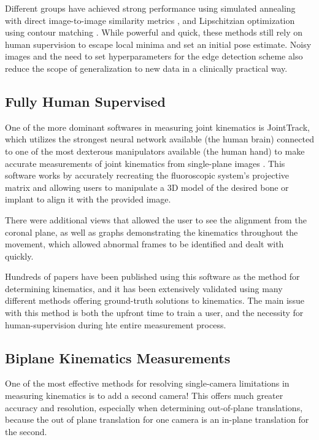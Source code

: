 Different groups have achieved strong performance using simulated annealing with direct image-to-image similarity metrics \cite{mahfouzRobustMethodRegistration2003}, and Lipschitzian optimization using contour matching \cite{floodAutomatedRegistration3D2018}. While powerful and quick, these methods still rely on human supervision to escape local minima and set an initial pose estimate. Noisy images and the need to set hyperparameters for the edge detection scheme also reduce the scope of generalization to new data in a clinically practical way.


\subsection{Fully Human Supervised}

One of the more dominant softwares in measuring joint kinematics is JointTrack, which utilizes the strongest neural network available (the human brain) connected to one of the most dexterous manipulators available (the human hand) to make accurate measurements of joint kinematics from single-plane images \cite{muJointTrackOpenSourceEasily2007}. This software works by accurately recreating the fluoroscopic system's projective matrix and allowing users to manipulate a 3D model of the desired bone or implant to align it with the provided image.

There were additional views that allowed the user to see the alignment from the coronal plane, as well as graphs demonstrating the kinematics throughout the movement, which allowed abnormal frames to be identified and dealt with quickly. 

Hundreds of papers have been published using this software as the method for determining kinematics, and it has been extensively validated using many different methods offering ground-truth solutions to kinematics. The main issue with this method is both the upfront time to train a user, and the necessity for human-supervision during hte entire measurement process. 

\subsection{Biplane Kinematics Measurements}

One of the most effective methods for resolving single-camera limitations in measuring kinematics is to add a second camera! This offers much greater accuracy and resolution, especially when determining out-of-plane translations, because the out of plane translation for one camera is an in-plane translation for the second.

